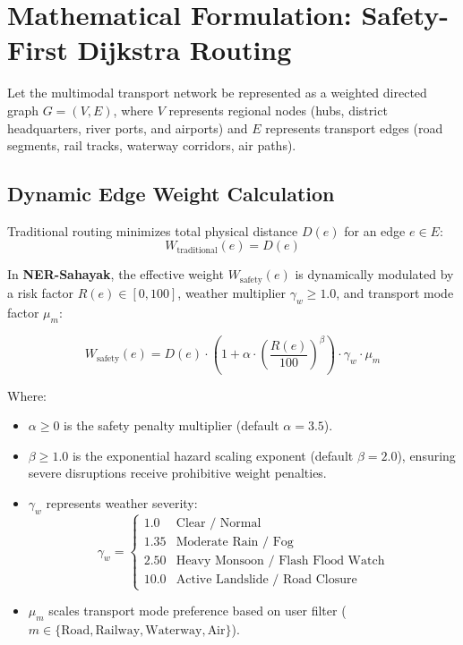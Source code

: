 \documentclass[11pt,a4paper]{article}
\begin{document}
\section{Mathematical Formulation: Safety-First Dijkstra Routing}
Let the multimodal transport network be represented as a weighted directed graph $G = (V, E)$, where $V$ represents regional nodes (hubs, district headquarters, river ports, and airports) and $E$ represents transport edges (road segments, rail tracks, waterway corridors, air paths).

\subsection{Dynamic Edge Weight Calculation}
Traditional routing minimizes total physical distance $D(e)$ for an edge $e \in E$:
\begin{equation}
    W_{\text{traditional}}(e) = D(e)
\end{equation}

In \textbf{NER-Sahayak}, the effective weight $W_{\text{safety}}(e)$ is dynamically modulated by a risk factor $R(e) \in [0, 100]$, weather multiplier $\gamma_w \ge 1.0$, and transport mode factor $\mu_m$:

\begin{equation}
    W_{\text{safety}}(e) = D(e) \cdot \left( 1 + \alpha \cdot \left(\frac{R(e)}{100}\right)^\beta \right) \cdot \gamma_w \cdot \mu_m
\end{equation}

Where:
\begin{itemize}
    \item $\alpha \ge 0$ is the safety penalty multiplier (default $\alpha = 3.5$).
    \item $\beta \ge 1.0$ is the exponential hazard scaling exponent (default $\beta = 2.0$), ensuring severe disruptions receive prohibitive weight penalties.
    \item $\gamma_w$ represents weather severity:
    \begin{equation}
        \gamma_w = \begin{cases} 
        1.0 & \text{Clear / Normal} \\
        1.35 & \text{Moderate Rain / Fog} \\
        2.50 & \text{Heavy Monsoon / Flash Flood Watch} \\
        10.0 & \text{Active Landslide / Road Closure}
        \end{cases}
    \end{equation}
    \item $\mu_m$ scales transport mode preference based on user filter ($m \in \{\text{Road}, \text{Railway}, \text{Waterway}, \text{Air}\}$).
\end{itemize}
\end{document}

